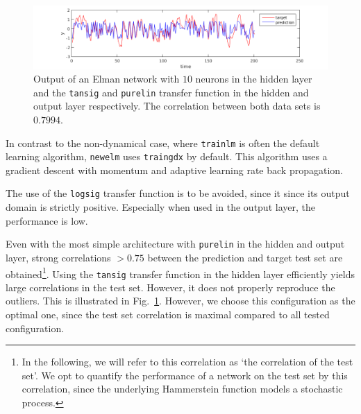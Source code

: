 \documentclass[10pt,a4paper]{article}
\begin{document}
\begin{figure}[tbh]
\centering
\includegraphics[width=\textwidth]{figs/tansig_purelin.png}
\caption{Output of an Elman network with $10$ neurons in the hidden layer and the \texttt{tansig} and \texttt{purelin} transfer function in the hidden and output layer respectively. The correlation between both data sets is $0.7994$. \label{fig:tansig_purelin}}
\end{figure}

In contrast to the non-dynamical case, where \texttt{trainlm} is often the default learning algorithm, \texttt{newelm} uses \texttt{traingdx} by default. This algorithm uses a gradient descent with momentum and adaptive learning rate back propagation.

The use of the \texttt{logsig} transfer function is to be avoided, since it since its output domain is strictly positive. Especially when used in the output layer, the performance is low.

Even with the most simple architecture with \texttt{purelin} in the hidden and output layer, strong correlations $>0.75$ between the prediction and target test set are obtained\footnote{In the following, we will refer to this correlation as `the correlation of the test set'. We opt to quantify the performance of a network on the test set by this correlation, since the underlying Hammerstein function models a stochastic process.}. Using the \texttt{tansig} transfer function in the hidden layer efficiently yields large correlations in the test set. However, it does not properly reproduce the outliers. This is illustrated in Fig.~\ref{fig:tansig_purelin}. However, we choose this configuration as the optimal one, since the test set correlation is maximal compared to all tested configuration.
\end{document}
